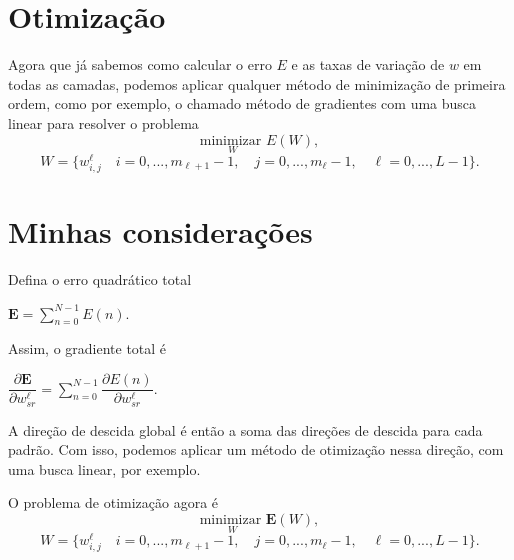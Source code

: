 \documentclass[12pt,a4paper]{article}
\def\bfE{\mathbf{E}}
\begin{document}
\section{Otimização}
Agora que já sabemos como calcular o erro $E$ e as taxas de variação de $w$ em todas as camadas, podemos aplicar qualquer método de minimização de primeira ordem, como por exemplo, o chamado método de gradientes com uma busca linear para resolver o problema
\[
\underset{W}{\mbox{minimizar }} E(W),
\]
\[
 W=\big\{w^\ell_{i,j}
 \quad i=0,...,m_{\ell+1}-1, \quad j=0,...,m_\ell-1,\quad \ell=0,...,L-1
\big\}.
\]



\section{Minhas considerações}
Defina o erro quadrático total

$\displaystyle
\bfE = \sum_{n=0}^{N-1} E(n).
$

\noindent Assim, o gradiente total é

$\displaystyle
\dfrac{\partial \bfE}{\partial w^{\ell}_{sr}} = \sum_{n=0}^{N-1} \dfrac{\partial E(n)}{\partial w^{\ell}_{sr}}.
$

\noindent A direção de descida global é então a soma das direções de descida para cada padrão. Com isso, podemos aplicar um método de otimização nessa direção, com uma busca linear, por exemplo.

O problema de otimização agora é
\[
\underset{W}{\mbox{minimizar }} \bfE(W),
\]
\[
 W=\big\{w^\ell_{i,j}
 \quad i=0,...,m_{\ell+1}-1, \quad j=0,...,m_\ell-1,\quad \ell=0,...,L-1
\big\}.
\]
\end{document}
